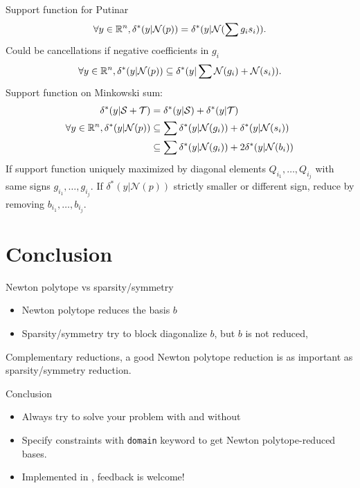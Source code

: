 \documentclass{beamer}
\newcommand{\newtonpoly}[1]{\mathcal{N}(#1)}
\newcommand{\supfun}[2]{\delta^*(#1|#2)}
\begin{document}
\begin{frame}{Support function for Putinar}
    \[ \forall y \in \R^n, \supfun{y}{\newtonpoly{p}} = \supfun{y}{\newtonpoly{\sum g_i s_i}}. \]
    Could be \alert{cancellations} if \alert{negative} coefficients in $g_i$
    \[ \forall y \in \R^n, \supfun{y}{\newtonpoly{p}} \subseteq \supfun{y}{\sum \newtonpoly{g_i} + \newtonpoly{s_i}}. \]
    \alert{Support} function on \alert{Minkowski} sum:
    \begin{align*}
      \supfun{y}{\mathcal{S} + \mathcal{T}} & = \supfun{y}{\mathcal{S}} + \supfun{y}{\mathcal{T}}\\
      \forall y \in \R^n, \supfun{y}{\newtonpoly{p}} & \subseteq \sum \supfun{y}{\newtonpoly{g_i}} + \supfun{y}{\newtonpoly{s_i}}\\
                                                     & \subseteq \sum \supfun{y}{\newtonpoly{g_i}} + 2\supfun{y}{\newtonpoly{b_i}}
    \end{align*}
    If support function uniquely maximized by \alert{diagonal} elements $Q_{i_1}, \ldots, Q_{i_j}$
    with same signs $g_{i_1}, \ldots, g_{i_j}$.
    If $\supfun{y}{\newtonpoly{p}}$ \alert{strictly} smaller or different sign, \alert{reduce} by removing $b_{i_1}, \ldots, b_{i_j}$.
\end{frame}

\section{Conclusion}

\begin{frame}{Newton polytope vs sparsity/symmetry}
    \begin{itemize}
        \item Newton polytope \alert{reduces} the basis $b$
        \item Sparsity/symmetry try to block diagonalize $b$, but $b$ is \alert{not reduced},
    \end{itemize}
    \alert{Complementary} reductions, a good Newton polytope reduction is as important as sparsity/symmetry reduction.
\end{frame}

\begin{frame}{Conclusion}
    \begin{itemize}
        \item Always try to solve your problem with and without 
        \item Specify constraints with \texttt{domain} keyword to get Newton polytope-reduced bases.
        \item Implemented in , feedback is welcome!
    \end{itemize}
\end{frame}
\end{document}
